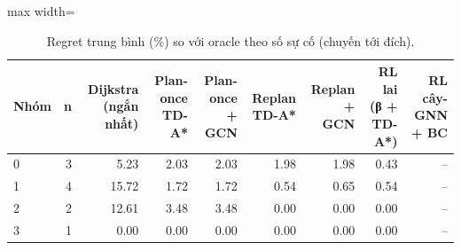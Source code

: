 \begin{table}[!htbp]
\centering
\small
\caption{Regret trung bình (\%) so với oracle theo số sự cố (chuyến tới đích).}
\label{tab:tab_by_incidents}
\begin{adjustbox}{max width=\linewidth}
\begin{tabular}{lrrrrrrrr}
\toprule
Nhóm & n & Dijkstra (ngắn nhất) & Plan-once TD-A* & Plan-once + GCN & Replan TD-A* & Replan + GCN & RL lai (β + TD-A*) & RL cây-GNN + BC \\
\midrule
0 & 3 & 5.23 & 2.03 & 2.03 & 1.98 & 1.98 & 0.43 & -- \\
1 & 4 & 15.72 & 1.72 & 1.72 & 0.54 & 0.65 & 0.54 & -- \\
2 & 2 & 12.61 & 3.48 & 3.48 & 0.00 & 0.00 & 0.00 & -- \\
3 & 1 & 0.00 & 0.00 & 0.00 & 0.00 & 0.00 & 0.00 & -- \\
\bottomrule
\end{tabular}
\end{adjustbox}
\end{table}
